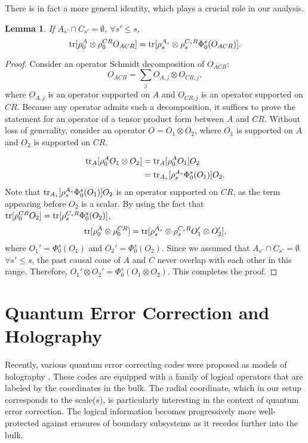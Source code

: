 \documentclass[a4paper,11pt]{article}
\newcommand{\1}{\mathbbm{1}}
\newcommand{\tr}{{\rm tr}}
\newtheorem{lem}{Lemma}
\begin{document}
There is in fact a more general identity, which plays a crucial role in our analysis.
\begin{lem}\label{lem:clustering_identity_general}
If $A_{s'} \cap C_{s'} =\emptyset $, $\forall s'\leq s$,
\begin{equation}
\tr[\rho_0^{A} \otimes \rho_0^{CR}O_{ACR}] = \tr[\rho_s^{A_s}\otimes \rho_s^{C_sR}\Phi_0^s(O_{ACR})]. \label{eq:clustering_identity_general}
\end{equation}
\end{lem}
\begin{proof}
Consider an operator Schmidt decomposition of $O_{ACR}$:
\begin{equation}
O_{ACR} = \sum_j O_{A,j}\otimes O_{CR,j},
\end{equation}
where $O_{A,j}$ is an operator supported on $A$ and $O_{CR,j}$ is an operator supported on $CR$. Because any operator admits such a decomposition, it suffices to prove the statement for an operator of a tensor product form between $A$ and $CR$. Without loss of generality, consider an operator $O=O_1\otimes O_2$, where $O_1$ is supported on $A$ and $O_2$ is supported on $CR$.

\begin{align}
\tr_A[\rho_0^A O_1 \otimes O_2] &= \tr_A[\rho_0^A O_1] O_2 \nonumber\\
&= \tr_{A_s}[\rho_s^{A_s} \Phi_0^s(O_1)] O_2. \nonumber
\end{align}
Note that $\tr_{A_s}[\rho_s^{A_s}\Phi_0^s(O_1)]O_2$ is an operator supported on $CR$, as the term appearing before $O_2$ is a scalar. By using the fact that
$\tr[\rho_0^{CR} O_2] = \tr[\rho_s^{C_sR}\Phi_0^s(O_2)]$,
\begin{align}
\tr[\rho_0^A \otimes \rho_0^{CR} ] = \tr[\rho_s^{A_s}\otimes \rho_s^{C_sR}O_1'\otimes O_2'],
\end{align}
where $O_1' = \Phi_0^s(O_1)$ and $O_2' = \Phi_0^s(O_2)$. Since we assumed that $A_{s'} \cap C_{s'} =\emptyset $ $\forall s'\leq s$, the past causal cone of $A$ and $C$ never overlap with each other in this
range. Therefore, $O_1' \otimes O_2' = \Phi_0^s(O_1\otimes O_2)$. This completes the proof.
\end{proof}

\section{Quantum Error Correction and Holography\label{section:qec_holography}}
Recently, various quantum error correcting codes were proposed as models of holography \cite{Pastawski2015,Yang2015,Hayden2016,Donnelly2016}. These codes are equipped with a family of logical
operators that are labeled by the coordinates in the bulk. The radial coordinate, which in our setup corresponds to the scale($s$), is particularly interesting in the context of quantum error
correction. The logical information becomes progressively more well-protected against erasures of boundary subsystems as it recedes further into the bulk.
\end{document}
